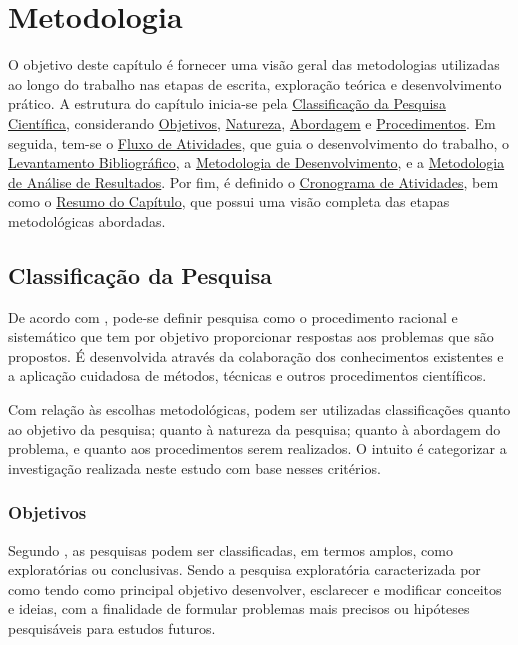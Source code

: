 \chapter[Metodologia]{Metodologia}
\label{chap:Metodologia}

O objetivo deste capítulo é fornecer uma visão geral das metodologias utilizadas ao longo do trabalho nas etapas de escrita, exploração teórica e desenvolvimento prático. 
A estrutura do capítulo inicia-se pela \hyperref[sec:Classificacao da Pesquisa]{Classificação da Pesquisa Científica}, considerando \hyperref[sec:Objetivos2]{Objetivos}, \hyperref[sec:Natureza]{Natureza}, \hyperref[sec:Abordagem]{Abordagem} e \hyperref[sec:Procedimentos]{Procedimentos}. 
Em seguida, tem-se o \hyperref[sec:Fluxo de Atividades]{Fluxo de Atividades}, que guia o desenvolvimento do trabalho, o \hyperref[sec:Levantamento Bibliografico]{Levantamento Bibliográfico}, a \hyperref[sec:Metodologia de Desenvolvimento]{Metodologia de Desenvolvimento}, e a 
\hyperref[sec:Metodologia de Analise de Resultados]{Metodologia de Análise de Resultados}. Por fim, é definido o \hyperref[sec:Cronograma]{Cronograma de Atividades}, bem como o \hyperref[sec:Resumo do Capitulo]{Resumo do Capítulo}, que possui uma visão completa das etapas 
metodológicas abordadas.

\section{Classificação da Pesquisa}
\label{sec:Classificacao da Pesquisa}
De acordo com , pode-se definir pesquisa como o procedimento racional e sistemático que tem por objetivo proporcionar respostas aos problemas que são propostos. É desenvolvida através da colaboração 
dos conhecimentos existentes e a aplicação cuidadosa de métodos, técnicas e outros procedimentos científicos.

Com relação às escolhas metodológicas, podem ser utilizadas classificações quanto ao objetivo da pesquisa; quanto à natureza da pesquisa; quanto à abordagem do problema, e quanto aos procedimentos serem realizados. O intuito é 
categorizar a investigação realizada neste estudo com base nesses critérios.

\subsection{Objetivos}
\label{sec:Objetivos2}
Segundo , as pesquisas podem ser classificadas, em termos amplos, como exploratórias ou conclusivas. Sendo a pesquisa exploratória caracterizada por  como tendo como principal objetivo 
desenvolver, esclarecer e modificar conceitos e ideias, com a finalidade de formular problemas mais precisos ou hipóteses pesquisáveis para estudos futuros.

